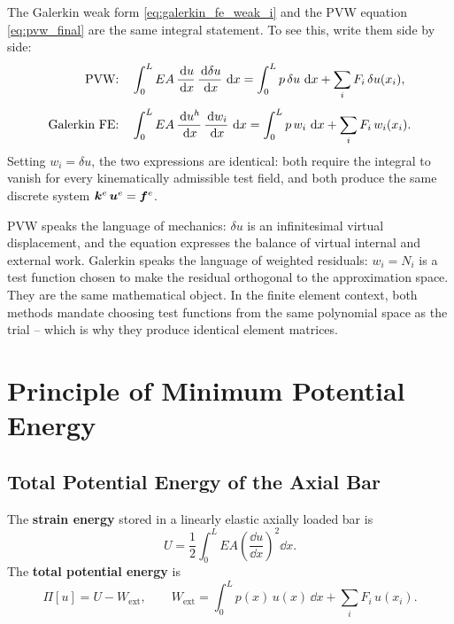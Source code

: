The Galerkin weak form \cref{eq:galerkin_fe_weak_i} and the PVW equation
\cref{eq:pvw_final} are the same integral statement. To see this, write them
side by side:
\begin{align}
    \text{PVW:}\quad
    &\int_0^L EA\,\frac{\,\mathrm{d} u}{\,\mathrm{d} x}\,\frac{\,\mathrm{d}\delta u}{\,\mathrm{d} x}\,\,\mathrm{d} x
     = \int_0^L p\,\delta u\,\,\mathrm{d} x + \sum_i F_i\,\delta u(x_i) , \notag \\[4pt]
    \text{Galerkin FE:}\quad
    &\int_0^L EA\,\frac{\,\mathrm{d} u^h}{\,\mathrm{d} x}\,\frac{\,\mathrm{d} w_i}{\,\mathrm{d} x}\,\,\mathrm{d} x
     = \int_0^L p\,w_i\,\,\mathrm{d} x + \sum_i F_i\,w_i(x_i) .
    \label{eq:galerkin_pvw_comparison}
\end{align}
Setting $w_i = \delta u$, the two expressions are identical: both require the
integral to vanish for every kinematically admissible test field, and both
produce the same discrete system $\bm{k}^e\,\bm{u}^e = \bm{f}^e$.

\begin{remark}
PVW speaks the language of mechanics: $\delta u$ is an infinitesimal virtual
displacement, and the equation expresses the balance of virtual internal and
external work. Galerkin speaks the language of weighted residuals: $w_i = N_i$
is a test function chosen to make the residual orthogonal to the approximation
space. They are the same mathematical object. In the finite element context,
both methods mandate choosing test functions from the same polynomial space as
the trial -- which is why they produce identical element matrices.
\end{remark}

\section{Principle of Minimum Potential Energy}
\label{sec:pmpe}

\subsection{Total Potential Energy of the Axial Bar}
\label{sec:pmpe_tpe}

\begin{definition}
The \textbf{strain energy} stored in a linearly elastic axially loaded bar is
\begin{equation}
    U = \frac{1}{2}\int_0^L EA\!\left(\frac{\dd u}{\dd x}\right)^{\!2}\dd x .
    \label{eq:pmpe_strain_energy}
\end{equation}
The \textbf{total potential energy} is
\begin{equation}
    \Pi[u] = U - W_{\mathrm{ext}},
    \qquad
    W_{\mathrm{ext}} = \int_0^L p(x)\,u(x)\,\dd x + \sum_i F_i\,u(x_i) .
    \label{eq:pmpe_tpe}
\end{equation}
\end{definition}

